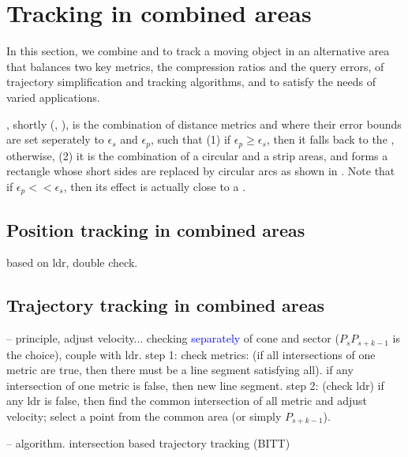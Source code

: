 

\section{Tracking in combined areas}
\label{sec:combine}

In this section, we combine \sed and \ped to track a moving object in an alternative area that balances two key metrics, \ie the compression ratios and the query errors, of trajectory simplification and tracking algorithms, and to satisfy the needs of varied applications.


, shortly \bed (\sed, \ped), is the combination of distance metrics \sed and \ped where their error bounds are set seperately to $\epsilon_s$ and $\epsilon_p$, such that (1) if $\epsilon_p \ge \epsilon_s$, then it falls back to the \sed, otherwise, (2) it is the combination of a circular and a strip areas, and forms a rectangle whose short sides are replaced by circular arcs as shown in . Note that if $\epsilon_p << \epsilon_s$, then its effect is actually close to a \ped.

\subsection{Position tracking in combined areas}
based on ldr, double check.


\subsection{Trajectory tracking in combined areas}

-- principle, adjust velocity...
	checking \textcolor{blue}{separately} of cone and sector ($P_sP_{s+k-1}$ is the choice), couple with ldr.
	step 1: check metrics: (if all intersections of one metric are true, then there must be a line segment satisfying all).
	if any intersection of one metric is false, then new line segment.
	step 2:	(check ldr) if any ldr is false, then find the common intersection of all metric and adjust velocity; select a point from the common area (or simply $P_{s+k-1}$).

-- algorithm. intersection based trajectory tracking (BITT)

